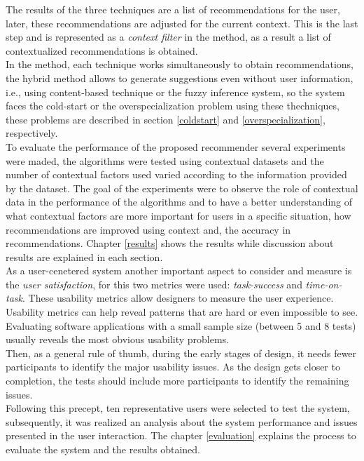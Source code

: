 The results of the three techniques are a list of recommendations for
the user, later, these recommendations are adjusted for the current context.
This is the last step and is represented as a \textit{context filter} in the
method, as a result a list of contextualized
recommendations is obtained. \\
In the method, each technique works simultaneously to obtain
recommendations, the hybrid method allows to generate suggestions even
without user information, i.e., using content-based technique or the
fuzzy inference system, so the system faces the cold-start or the
overspecialization problem using these thechniques, these problems are
described in section \ref{coldstart} and 
\ref{overspecialization}, respectively.\\
To evaluate the performance of the proposed recommender several experiments
were maded, the algorithms were tested using contextual datasets and
the number of contextual factors used varied according to the information
provided by the dataset. The goal of the experiments were to observe
the role of contextual data  in the performance of the algorithms and to 
have a better understanding of what contextual
factors are more important for users in a specific situation, how recommendations
are improved using context and, the accuracy in recommendations.
Chapter \ref{results} shows the results while discussion about results are
explained in each section.\\
As a user-cenetered system another important aspect 
to consider and measure is the \textit{user satisfaction}, for this two
metrics were used: \textit{task-success} and \textit
{time-on-task}. These usability metrics allow designers to measure 
the user experience.
\\ Usability
metrics can help reveal patterns that are hard or even impossible to
see. Evaluating software applications with a small sample size 
(between 5 and 8 tests) usually reveals the most obvious 
usability problems\cite{albert2013measuring}.\\ 
Then, as
a general rule of thumb, during the early stages of design, it needs
fewer participants to identify the major usability issues. As the
design gets closer to completion, the tests should include more
participants to identify the remaining
issues\cite{albert2013measuring}.\\ 
Following this precept, ten representative users were selected to test
the system, subsequently, it was realized an analysis about the system
performance and issues presented in the user interaction. The chapter
\ref{evaluation} explains the process to evaluate the system and the
results obtained.
